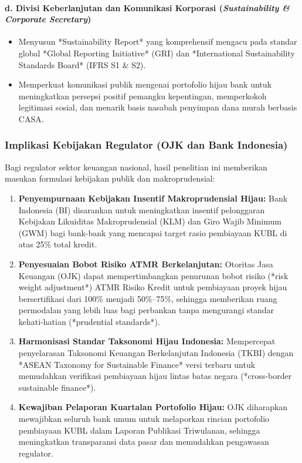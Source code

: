 \documentclass[12pt,a4paper]{article}
\numberwithin{equation}{section}
\begin{document}
\paragraph{d. Divisi Keberlanjutan dan Komunikasi Korporasi (\emph{Sustainability \& Corporate Secretary})}
\begin{itemize}
  \item Menyusun *Sustainability Report* yang komprehensif mengacu pada standar global *Global Reporting Initiative* (GRI) dan *International Sustainability Standards Board* (IFRS S1 \& S2).
  \item Memperkuat komunikasi publik mengenai portofolio hijau bank untuk meningkatkan persepsi positif pemangku kepentingan, memperkokoh legitimasi sosial, dan menarik basis nasabah penyimpan dana murah berbasis CASA.
\end{itemize}

\subsubsection{Implikasi Kebijakan Regulator (OJK dan Bank Indonesia)}
\noindent
Bagi regulator sektor keuangan nasional, hasil penelitian ini memberikan masukan formulasi kebijakan publik dan makroprudensial:
\begin{enumerate}
  \item \textbf{Penyempurnaan Kebijakan Insentif Makroprudensial Hijau:} Bank Indonesia (BI) disarankan untuk meningkatkan insentif pelonggaran Kebijakan Likuiditas Makroprudensial (KLM) dan Giro Wajib Minimum (GWM) bagi bank-bank yang mencapai target rasio pembiayaan KUBL di atas 25\% total kredit.
  \item \textbf{Penyesuaian Bobot Risiko ATMR Berkelanjutan:} Otoritas Jasa Keuangan (OJK) dapat mempertimbangkan penurunan bobot risiko (*risk weight adjustment*) ATMR Risiko Kredit untuk pembiayaan proyek hijau bersertifikasi dari 100\% menjadi 50\%--75\%, sehingga memberikan ruang permodalan yang lebih luas bagi perbankan tanpa mengurangi standar kehati-hatian (*prudential standards*).
  \item \textbf{Harmonisasi Standar Taksonomi Hijau Indonesia:} Mempercepat penyelarasan Taksonomi Keuangan Berkelanjutan Indonesia (TKBI) dengan *ASEAN Taxonomy for Sustainable Finance* versi terbaru untuk memudahkan verifikasi pembiayaan hijau lintas batas negara (*cross-border sustainable finance*).
  \item \textbf{Kewajiban Pelaporan Kuartalan Portofolio Hijau:} OJK diharapkan mewajibkan seluruh bank umum untuk melaporkan rincian portofolio pembiayaan KUBL dalam Laporan Publikasi Triwulanan, sehingga meningkatkan transparansi data pasar dan memudahkan pengawasan regulator.
\end{enumerate}
\end{document}
